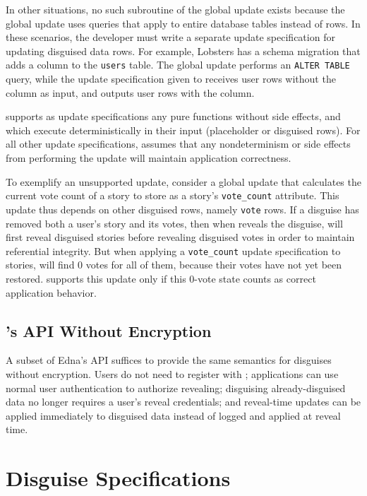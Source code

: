 %
    In other situations, no such subroutine of the global update exists because
    the global update uses queries that apply to entire database tables instead
    of rows.  In these scenarios, the developer must write a separate update
    specification for updating disguised data rows.
%
    For example, Lobsters has a schema migration that adds a column to the
    \texttt{users} table.  The global update performs an \texttt{ALTER TABLE}
    query, while the update specification given to \sys receives user rows
    without the column as input, and outputs user rows with the column.
%

\sys supports as update specifications any pure functions without side effects,
and which execute deterministically in their input (placeholder or disguised
rows).
%
For all other update specifications, \sys assumes that any nondeterminism or side effects from performing the
    update will maintain application correctness.

%
    To exemplify an unsupported update, consider a global update that calculates the
    current vote count of a story to store as a story's \texttt{vote\_count}
    attribute. 
%
    This update thus depends on other disguised rows, namely \texttt{vote} rows.
%
    If a disguise has removed both a user's story and its votes, then when \sys
    reveals the disguise, \sys will first reveal disguised stories before
    revealing disguised votes in order to maintain referential integrity. 
%
    But when applying a \texttt{vote\_count} update specification to stories,
    \sys will find 0 votes for all of them, because their votes have not yet
    been restored.
%
    \sys supports this update only if this 0-vote state counts as correct
    application behavior.
%

    
\subsection{\sys's API Without Encryption}
\label{s:noencrypt-api}
A subset of Edna's API suffices to provide the same semantics for disguises
without encryption. Users do not need to register with \sys; applications can
use normal user authentication to authorize revealing; disguising
already-disguised data no longer requires a user's reveal credentials; and
reveal-time updates can be applied immediately to disguised data instead of
logged and applied at reveal time.

\section{Disguise Specifications}
\label{s:semantics:spec}

